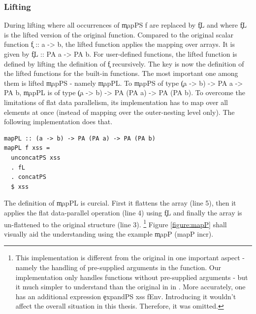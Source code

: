     \subsubsection{Lifting}
      During lifting where all occurrences of \c{mapPS f} are
      replaced by \c{fL} and where \c{fL}
      is the lifted version of the original function.
      Compared to the original scalar function \c{f :: a -> b}, the lifted
      function applies the mapping over arrays. It is given by \c{fL :: PA a -> PA b}.
      For user-defined functions, the lifted function is defined by lifting the definition of \c{f} recursively.
      The key is now the definition of the lifted functions for the built-in functions.
      The most important one among them is lifted \c{mapPS} - namely \c{mapPL}.
      To \c{mapPS} of type \c{(a -> b) -> PA a -> PA b},
      \c{mapPL} is of type \c{(a -> b) -> PA (PA a) -> PA (PA b)}.
      To overcome the limitations of flat data parallelism,
      its implementation has to map over all elements at once
      (instead of mapping over the outer-nesting level only).
      The following implementation does that.
    \begin{lstlisting}
mapPL :: (a -> b) -> PA (PA a) -> PA (PA b)
mapPL f xss =
  unconcatPS xss
  . fL
  . concatPS
  $ xss
    \end{lstlisting}
    The definition of \c{mapPL} is curcial.
    First it flattens the array (line 5), then it applies
    the flat data-parallel operation (line 4) using \c{fL}
    and finally the array is un-flattened to the original structure (line 3).
    \footnote{This implementation is different from the original in one important aspect - 
    namely the handling of pre-supplied arguments in the function. Our
    implementation only handles functions without pre-supplied arguments -
    but it much simpler to understand than the original in
    in \cite{HighOrdFlat2006}.
    More accurately, one has an additional expression \c{expandPS xss fEnv}.
    Introducing it wouldn't affect the overall situation in this thesis.
    Therefore, it was omitted.
    } 
    Figure \ref{figure:mapP} shall visually aid the understanding
    using the example \c{mapP (mapP incr)}.
    
